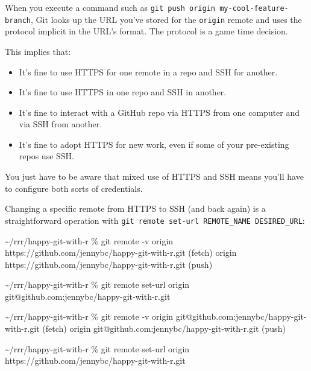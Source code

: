 \documentclass[
]{book}
\newenvironment{Shaded}{\begin{snugshade}}{\end{snugshade}}
\newcommand{\NormalTok}[1]{#1}
\providecommand{\tightlist}{%
  \setlength{\itemsep}{0pt}\setlength{\parskip}{0pt}}
\begin{document}
When you execute a command such as \texttt{git\ push\ origin\ my-cool-feature-branch}, Git looks up the URL you've stored for the \texttt{origin} remote and uses the protocol implicit in the URL's format.
The protocol is a game time decision.

This implies that:

\begin{itemize}
\tightlist
\item
  It's fine to use HTTPS for one remote in a repo and SSH for another.\\
\item
  It's fine to use HTTPS in one repo and SSH in another.\\
\item
  It's fine to interact with a GitHub repo via HTTPS from one computer and via SSH from another.\\
\item
  It's fine to adopt HTTPS for new work, even if some of your pre-existing repos use SSH.
\end{itemize}

You just have to be aware that mixed use of HTTPS and SSH means you'll have to configure both sorts of credentials.

Changing a specific remote from HTTPS to SSH (and back again) is a straightforward operation with \texttt{git\ remote\ set-url\ REMOTE\_NAME\ DESIRED\_URL}:

\begin{Shaded}
\begin{Highlighting}[]
\NormalTok{\textasciitilde{}/rrr/happy{-}git{-}with{-}r \% git remote {-}v}
\NormalTok{origin  https://github.com/jennybc/happy{-}git{-}with{-}r.git (fetch)}
\NormalTok{origin  https://github.com/jennybc/happy{-}git{-}with{-}r.git (push)}

\NormalTok{\textasciitilde{}/rrr/happy{-}git{-}with{-}r \% git remote set{-}url origin git@github.com:jennybc/happy{-}git{-}with{-}r.git}

\NormalTok{\textasciitilde{}/rrr/happy{-}git{-}with{-}r \% git remote {-}v}
\NormalTok{origin  git@github.com:jennybc/happy{-}git{-}with{-}r.git (fetch)}
\NormalTok{origin  git@github.com:jennybc/happy{-}git{-}with{-}r.git (push)}

\NormalTok{\textasciitilde{}/rrr/happy{-}git{-}with{-}r \% git remote set{-}url origin https://github.com/jennybc/happy{-}git{-}with{-}r.git}
\end{Highlighting}
\end{Shaded}
\end{document}
